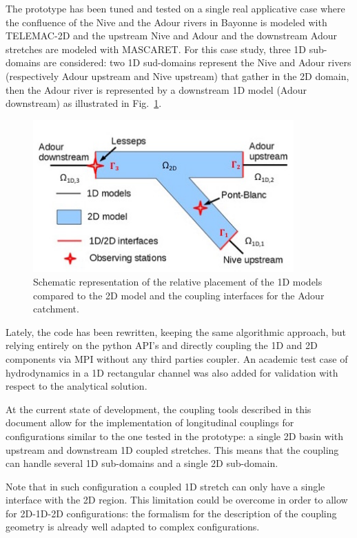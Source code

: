 \documentclass[Coupling]{../../data/TelemacDoc} %
\begin{document}
The prototype has been tuned and tested on a single real applicative case
where the confluence of the Nive and the Adour rivers in Bayonne is
modeled with TELEMAC-2D and the upstream Nive and Adour and the
downstream Adour stretches are modeled with MASCARET. For this case
study, three 1D sub-domains are considered: two 1D sud-domains
represent the Nive and Adour rivers (respectively Adour upstream and
Nive upstream) that gather in the 2D domain, then the Adour river is
represented by a downstream 1D model (Adour downstream) as illustrated
in Fig.~\ref{fig:schema_coupling_2}. 
\begin{figure}[htbp]
    \centering
        \centering \includegraphics[width=10cm]{figures/schema_coupling_2.jpg}
    \caption{Schematic representation of the relative placement of the
      1D models compared to the 2D model and the coupling interfaces
      for the Adour catchment.}\label{fig:schema_coupling_2} 
\end{figure}

Lately, the code has been rewritten, keeping the same algorithmic
approach, but relying entirely on the python API's and directly
coupling the 1D and 2D components via MPI without any third parties coupler.
An academic test case of hydrodynamics in a 1D rectangular channel was also added for validation with respect to the analytical solution.

At the current state of development, the coupling tools described in
this document allow for the implementation of longitudinal couplings
for configurations similar to the one tested in the prototype: a
single 2D basin with upstream and downstream 1D coupled
stretches. This means that the coupling can handle several 1D
sub-domains and a single 2D sub-domain. 

Note that in such  configuration a coupled 1D stretch
can only have a single interface with the 2D region. This limitation
could be overcome in order to allow for 2D-1D-2D configurations:
the formalism for the description of the 
coupling geometry is already well adapted to complex configurations.\newline
\end{document}
